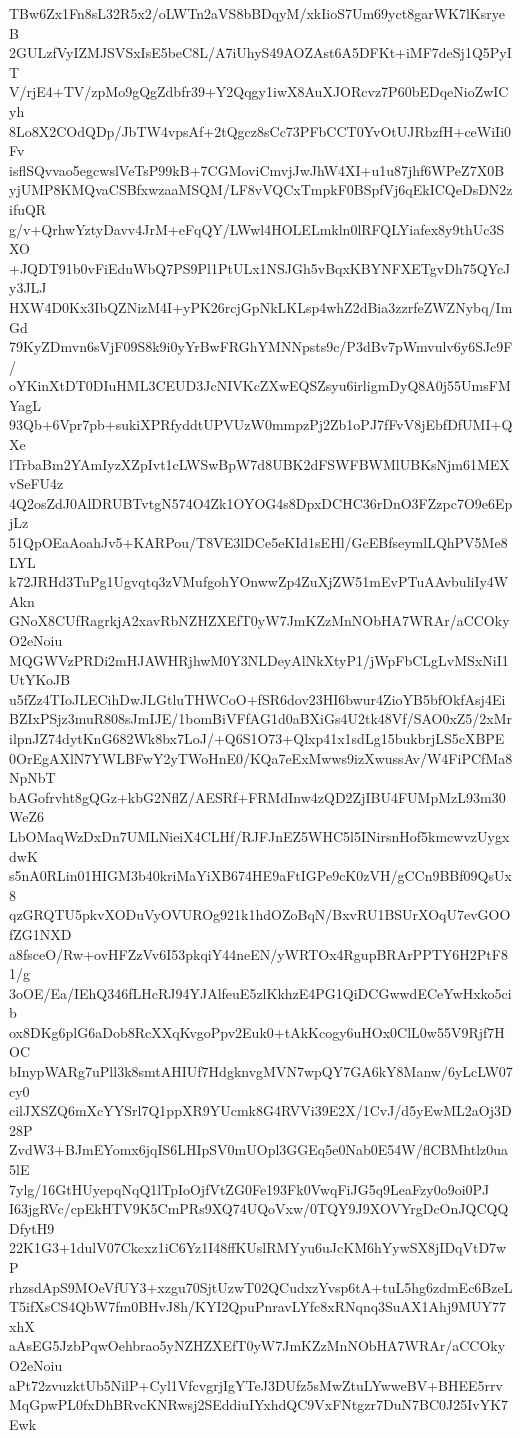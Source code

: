 TBw6Zx1Fn8sL32R5x2/oLWTn2aVS8bBDqyM/xkIioS7Um69yct8garWK7lKsryeB
2GULzfVyIZMJSVSxIsE5beC8L/A7iUhyS49AOZAst6A5DFKt+iMF7deSj1Q5PyIT
V/rjE4+TV/zpMo9gQgZdbfr39+Y2Qqgy1iwX8AuXJORcvz7P60bEDqeNioZwICyh
8Lo8X2COdQDp/JbTW4vpsAf+2tQgcz8sCc73PFbCCT0YvOtUJRbzfH+ceWiIi0Fv
isflSQvvao5egcwslVeTsP99kB+7CGMoviCmvjJwJhW4XI+u1u87jhf6WPeZ7X0B
yjUMP8KMQvaCSBfxwzaaMSQM/LF8vVQCxTmpkF0BSpfVj6qEkICQeDsDN2zifuQR
g/v+QrhwYztyDavv4JrM+eFqQY/LWwl4HOLELmkln0lRFQLYiafex8y9thUc3SXO
+JQDT91b0vFiEduWbQ7PS9Pl1PtULx1NSJGh5vBqxKBYNFXETgvDh75QYcJy3JLJ
HXW4D0Kx3IbQZNizM4I+yPK26rcjGpNkLKLsp4whZ2dBia3zzrfeZWZNybq/ImGd
79KyZDmvn6sVjF09S8k9i0yYrBwFRGhYMNNpsts9c/P3dBv7pWmvulv6y6SJc9F/
oYKinXtDT0DIuHML3CEUD3JcNIVKcZXwEQSZsyu6irligmDyQ8A0j55UmsFMYagL
93Qb+6Vpr7pb+sukiXPRfyddtUPVUzW0mmpzPj2Zb1oPJ7fFvV8jEbfDfUMI+QXe
lTrbaBm2YAmIyzXZpIvt1cLWSwBpW7d8UBK2dFSWFBWMlUBKsNjm61MEXvSeFU4z
4Q2osZdJ0AlDRUBTvtgN574O4Zk1OYOG4s8DpxDCHC36rDnO3FZzpc7O9e6EpjLz
51QpOEaAoahJv5+KARPou/T8VE3lDCe5eKId1sEHl/GcEBfseymlLQhPV5Me8LYL
k72JRHd3TuPg1Ugvqtq3zVMufgohYOnwwZp4ZuXjZW51mEvPTuAAvbuliIy4WAkn
GNoX8CUfRagrkjA2xavRbNZHZXEfT0yW7JmKZzMnNObHA7WRAr/aCCOkyO2eNoiu
MQGWVzPRDi2mHJAWHRjhwM0Y3NLDeyAlNkXtyP1/jWpFbCLgLvMSxNiI1UtYKoJB
u5fZz4TIoJLECihDwJLGtluTHWCoO+fSR6dov23HI6bwur4ZioYB5bfOkfAsj4Ei
BZIxPSjz3muR808sJmIJE/1bomBiVFfAG1d0aBXiGs4U2tk48Vf/SAO0xZ5/2xMr
ilpnJZ74dytKnG682Wk8bx7LoJ/+Q6S1O73+Qlxp41x1sdLg15bukbrjLS5cXBPE
0OrEgAXlN7YWLBFwY2yTWoHnE0/KQa7eExMwws9izXwussAv/W4FiPCfMa8NpNbT
bAGofrvht8gQGz+kbG2NflZ/AESRf+FRMdInw4zQD2ZjIBU4FUMpMzL93m30WeZ6
LbOMaqWzDxDn7UMLNieiX4CLHf/RJFJnEZ5WHC5l5INirsnHof5kmcwvzUygxdwK
s5nA0RLin01HIGM3b40kriMaYiXB674HE9aFtIGPe9cK0zVH/gCCn9BBf09QsUx8
qzGRQTU5pkvXODuVyOVUROg921k1hdOZoBqN/BxvRU1BSUrXOqU7evGOOfZG1NXD
a8fsceO/Rw+ovHFZzVv6I53pkqiY44neEN/yWRTOx4RgupBRArPPTY6H2PtF81/g
3oOE/Ea/IEhQ346fLHcRJ94YJAlfeuE5zlKkhzE4PG1QiDCGwwdECeYwHxko5cib
ox8DKg6plG6aDob8RcXXqKvgoPpv2Euk0+tAkKcogy6uHOx0ClL0w55V9Rjf7HOC
bInypWARg7uPll3k8smtAHIUf7HdgknvgMVN7wpQY7GA6kY8Manw/6yLcLW07cy0
cilJXSZQ6mXcYYSrl7Q1ppXR9YUcmk8G4RVVi39E2X/1CvJ/d5yEwML2aOj3D28P
ZvdW3+BJmEYomx6jqIS6LHIpSV0mUOpl3GGEq5e0Nab0E54W/flCBMhtlz0ua5lE
7ylg/16GtHUyepqNqQ1lTpIoOjfVtZG0Fe193Fk0VwqFiJG5q9LeaFzy0o9oi0PJ
I63jgRVc/cpEkHTV9K5CmPRs9XQ74UQoVxw/0TQY9J9XOVYrgDcOnJQCQQDfytH9
22K1G3+1dulV07Ckcxz1iC6Yz1I48ffKUslRMYyu6uJcKM6hYywSX8jIDqVtD7wP
rhzsdApS9MOeVfUY3+xzgu70SjtUzwT02QCudxzYvsp6tA+tuL5hg6zdmEc6BzeL
T5ifXsCS4QbW7fm0BHvJ8h/KYI2QpuPnravLYfc8xRNqnq3SuAX1Ahj9MUY77xhX
aAsEG5JzbPqwOehbrao5yNZHZXEfT0yW7JmKZzMnNObHA7WRAr/aCCOkyO2eNoiu
aPt72zvuzktUb5NilP+Cyl1VfcvgrjIgYTeJ3DUfz5sMwZtuLYwweBV+BHEE5rrv
MqGpwPL0fxDhBRvcKNRwsj2SEddiuIYxhdQC9VxFNtgzr7DuN7BC0J25IvYK7Ewk

